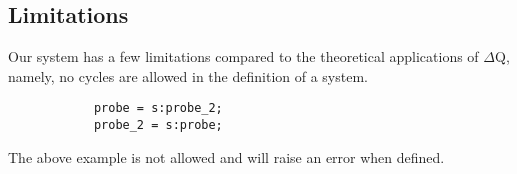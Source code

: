         \subsection{Limitations}
            Our system has a few limitations compared to the theoretical applications of $\Delta$Q, namely, no cycles are allowed in the definition of a system.
        \begin{verbatim}
            probe = s:probe_2;
            probe_2 = s:probe;
        \end{verbatim}
        The above example is not allowed and will raise an error when defined. 
   
